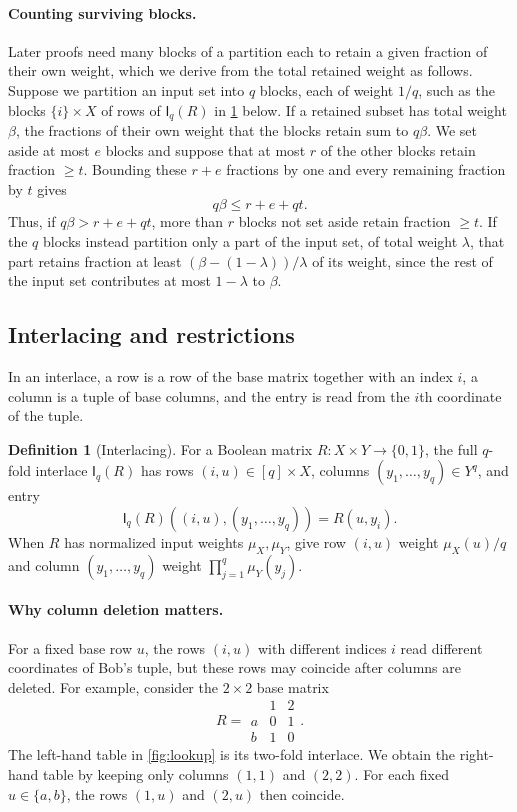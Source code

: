 \documentclass[11pt,letterpaper]{article} \usepackage[utf8]{inputenc}
\theoremstyle{plain} \newtheorem{theorem}{Theorem}[section]
\theoremstyle{definition} \newaliascnt{definition}{theorem}
\newtheorem{definition}[definition]{Definition} \aliascntresetthe{definition}
\newcommand{\Int}[2]{\mathsf{I}_{#1}(#2)}
\begin{document}
\paragraph{Counting surviving blocks.}
Later proofs need many blocks of a partition each to retain a given fraction of
their own weight, which we derive from the total retained weight as follows.
Suppose we partition an input set into $q$ blocks, each of weight $1/q$, such as the
blocks $\{i\}\times X$ of rows of $\Int{q}{R}$ in
\cref{def:interlace} below. If a retained subset
has total weight $\beta$, the fractions of their own weight that the blocks retain sum
to $q\beta$. We set aside at most $e$ blocks and suppose that at most $r$ of the other blocks
retain fraction $\ge t$. Bounding these $r+e$ fractions by one and
every remaining fraction by $t$ gives
\[
q\beta\le r+e+qt.
\]
Thus, if $q\beta>r+e+qt$, more than $r$ blocks not set aside retain
fraction $\ge t$. If the $q$ blocks instead partition only a part of the
input set, of total weight $\lambda$, that part retains fraction at least
$(\beta-(1-\lambda))/\lambda$ of its weight, since the rest of the input set
contributes at most $1-\lambda$ to $\beta$.

\subsection{Interlacing and restrictions}
\label{sec:interlacing}

In an interlace, a row is a row of the base matrix together with an
index $i$, a column is a tuple of base columns, and the entry is read from
the $i$th coordinate of the tuple.

\begin{definition}[Interlacing]\label{def:interlace}
For a Boolean matrix $R:X\times Y\to\{0,1\}$,
the full $q$-fold interlace $\Int{q}{R}$ has rows $(i,u)\in[q]\times X$,
columns $(y_1,\ldots,y_q)\in Y^q$, and entry
\[
\Int{q}{R}((i,u),(y_1,\ldots,y_q))=R(u,y_i).
\]
When $R$ has normalized input weights $\mu_X,\mu_Y$, give row $(i,u)$
weight $\mu_X(u)/q$ and column $(y_1,\ldots,y_q)$ weight
$\prod_{j=1}^q\mu_Y(y_j)$.
\end{definition}

\paragraph{Why column deletion matters.}
For a fixed base row $u$, the rows $(i,u)$ with different indices $i$ read
different coordinates of Bob's tuple, but these rows may coincide after
columns are deleted. For example, consider the $2\times2$ base matrix
\[
R=\begin{array}{c|cc}
     & 1 & 2\\ \hline
  a  & 0 & 1\\
  b  & 1 & 0
\end{array}.
\]
The left-hand table in \cref{fig:lookup} is its two-fold interlace.
We obtain the right-hand table by keeping only columns $(1,1)$ and $(2,2)$.
For each fixed $u\in\{a,b\}$, the rows $(1,u)$ and $(2,u)$ then coincide.
\end{document}
